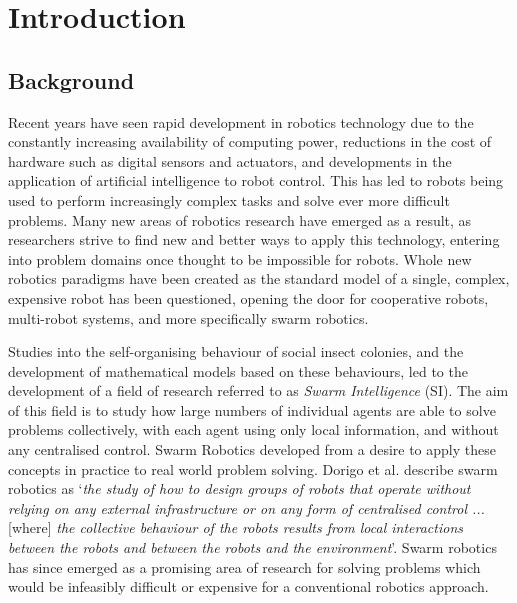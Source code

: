 
\chapter[Introduction]{Introduction} %

\label{Chapter1} %


\newcommand{\keyword}[1]{\textbf{#1}}
\newcommand{\tabhead}[1]{\textbf{#1}}
\newcommand{\code}[1]{\texttt{#1}}
\newcommand{\file}[1]{\texttt{\bfseries#1}}
\newcommand{\option}[1]{\texttt{\itshape#1}}


\section{Background}
Recent years have seen rapid development in robotics technology due to the constantly increasing availability of computing power, reductions in the cost of hardware such as digital sensors and actuators, and developments in the application of artificial intelligence to robot control. This has led to robots being used to perform increasingly complex tasks and solve ever more difficult problems. Many new areas of robotics research have emerged as a result, as researchers strive to find new and better ways to apply this technology, entering into problem domains once thought to be impossible for robots. Whole new robotics paradigms have been created as the standard model of a single, complex, expensive robot has been questioned, opening the door for cooperative robots, multi-robot systems, and more specifically swarm robotics.

Studies into the self-organising behaviour of social insect colonies, and the development of mathematical models based on these behaviours, led to the development of a field of research referred to as \textit{Swarm Intelligence} (SI). The aim of this field is to study how large numbers of individual agents are able to solve problems collectively, with each agent using only local information, and without any centralised control. Swarm Robotics developed from a desire to apply these concepts in practice to real world problem solving. Dorigo et al. describe swarm robotics as `\textit{the study of how to design groups of robots that operate without relying on any external infrastructure or on any form of centralised control ... }[where]\textit{ the collective behaviour of the robots results from local interactions between the robots and between the robots and the environment}\cite{Dorigo:2014}'. Swarm robotics has since emerged as a promising area of research for solving problems which would be infeasibly difficult or expensive for a conventional robotics approach.

